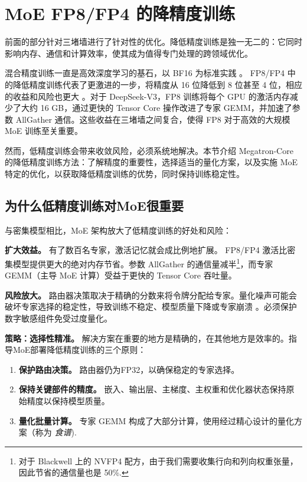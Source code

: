 \documentclass[10pt,logo,copyright]{nvidiatechreport_zh}
\begin{document}
\section{MoE FP8/FP4 的降精度训练}\label{sec:reduced-precision-training}

前面的部分针对三堵墙进行了针对性的优化。降低精度训练是独一无二的：它同时影响内存、通信和计算效率，使其成为值得专门处理的跨领域优化。

混合精度训练一直是高效深度学习的基石，以 BF16 为标准实践 \cite{micikevicius2018mixed,peng2023fp8lmtrainingfp8large,xi2024coat}。 FP8/FP4 中的降低精度训练代表了更激进的一步，将精度从 16 位降低到 8 位甚至 4 位，相应的收益和风险也更大 \cite{micikevicius2022fp8formatsdeeplearning,fishman2025scalingfp8trainingtrilliontoken}。对于 DeepSeek-V3，FP8 训练将每个 GPU 的激活内存减少了大约 16 GB，通过更快的 Tensor Core 操作改进了专家 GEMM，并加速了参数 AllGather 通信。这些收益在三堵墙之间复合，使得 FP8 对于高效的大规模 MoE 训练至关重要。

然而，低精度训练会带来收敛风险，必须系统地解决。本节介绍 Megatron-Core 的降低精度训练方法：了解精度的重要性，选择适当的量化方案，以及实施 MoE 特定的优化，以获取降低精度训练的优势，同时保持训练稳定性。

\subsection{为什么低精度训练对MoE很重要}\label{sec:precision-anatomy}

与密集模型相比，MoE 架构放大了低精度训练的好处和风险：

\textbf{扩大效益。} 有了数百名专家，激活记忆就会成比例地扩展。 FP8/FP4 激活比密集模型提供更大的绝对内存节省。参数 AllGather 的通信量减半\footnote{对于 Blackwell 上的 NVFP4 配方，由于我们需要收集行向和列向权重张量，因此节省的通信量也是 50\%.}，而专家 GEMM（主导 MoE 计算）受益于更快的 Tensor Core 吞吐量。

\textbf{风险放大。} 路由器决策取决于精确的分数来将令牌分配给专家。量化噪声可能会破坏专家选择的稳定性，导致训练不稳定、模型质量下降或专家崩溃 \cite{nagel2021whitepaper}。必须保护数字敏感组件免受过度量化。

\textbf{策略：选择性精准。} 解决方案在重要的地方是精确的，在其他地方是效率的。指导MoE部署降低精度训练的三个原则：
\begin{enumerate}
    \item \textbf{保护路由决策。} 路由器仍为FP32，以确保稳定的专家选择。
    \item \textbf{保持关键部件的精度。} 嵌入、输出层、主梯度、主权重和优化器状态保持原始精度以保持模型质量。
    \item \textbf{量化批量计算。} 专家 GEMM 构成了大部分计算，使用经过精心设计的量化方案（称为 \textit{食谱}).
\end{enumerate}
\end{document}
